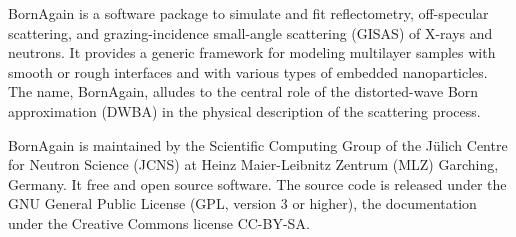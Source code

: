 

\cleardoublepage
{}


BornAgain is a software package
to simulate and fit
reflectometry, off-specular scattering,
and grazing-incidence small-angle scattering (GISAS)
of X-rays and neutrons.
It provides a generic framework
for modeling multilayer samples with smooth or
rough interfaces and with various types of embedded nanoparticles.
The name, BornAgain,
alludes to the central role of the distorted-wave Born
approximation (DWBA) in the physical description of the
scattering process.

BornAgain is maintained
by the Scientific Computing Group
of the J\"ulich Centre for Neutron Science (JCNS)
at Heinz Maier-Leibnitz Zentrum (MLZ) Garching, Germany.
It free and open source software.
The source code is released under the GNU General Public License (GPL, version 3 or higher),
the documentation under the Creative Commons license CC-BY-SA.


